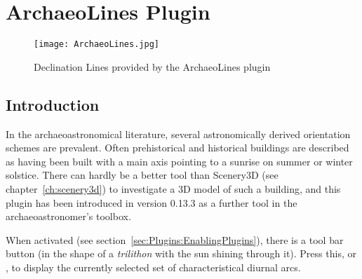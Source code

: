 

% 
% 
% 
\newpage
\section{ArchaeoLines Plugin}
\label{sec:plugin:ArchaeoLines}

\begin{figure}[ht]
\texttt{[image: ArchaeoLines.jpg]}
\caption{Declination Lines provided by the ArchaeoLines plugin}
\label{fig:plugin:ArchaeoLines}
\end{figure}


\subsection{Introduction}
\label{sec:plugin:ArchaeoLines:Introduction}

In the archaeoastronomical literature, several astronomically derived
orientation schemes are prevalent. Often prehistorical and historical
buildings are described as having been built with a main axis pointing
to a sunrise on summer or winter solstice. There can hardly be a
better tool than Scenery3D (see chapter~\ref{ch:scenery3d}) to
investigate a 3D model of such a building, and this plugin has been
introduced in version 0.13.3 as a further tool in the
archaeoastronomer's toolbox.

When activated (see section~\ref{sec:Plugins:EnablingPlugins}), there
is a tool bar button  (in the
shape of a \emph{trilithon} with the sun shining through it). Press
this, or , to display the currently selected set of
characteristical diurnal arcs.

